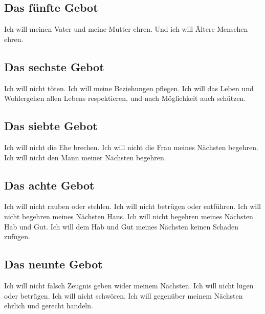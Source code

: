 \documentclass[12pt,a4paper]{article}
\begin{document}
%			
%		
		
	\subsection{Das f\"unfte Gebot}
		Ich will meinen Vater und meine Mutter ehren.
		Und ich will \"Altere Menschen ehren.
			
	\subsection{Das sechste Gebot}
		Ich will nicht t\"oten.
		Ich will meine Beziehungen pflegen.
		Ich will das Leben und Wohlergehen allen Lebens respektieren,
		und nach M\"oglichkeit auch sch\"utzen.
		
	\subsection{Das siebte Gebot}
		Ich will nicht die Ehe brechen.
		Ich will nicht die Frau meines N\"achsten begehren.
		Ich will nicht den Mann meiner N\"achsten begehren.
		
	\subsection{Das achte Gebot}
		Ich will nicht rauben oder stehlen.
		Ich will nicht betr\"ugen oder entf\"uhren.
		Ich will nicht begehren meines N\"achsten Haus.
		Ich will nicht begehren meines N\"achsten Hab und Gut.
		Ich will dem Hab und Gut meines N\"achsten keinen Schaden zuf\"ugen.
		
	\subsection{Das neunte Gebot}
		Ich will nicht falsch Zeugnis geben wider meinem N\"achsten.
		Ich will nicht l\"ugen oder betr\"ugen.
		Ich will nicht schw\"oren.
		Ich will gegen\"uber meinem N\"achsten ehrlich und gerecht handeln.
		
\end{document}
